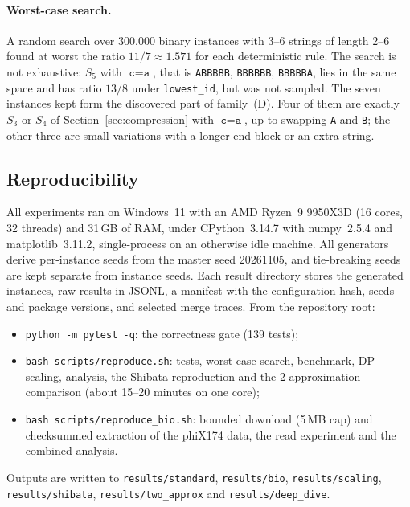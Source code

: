 \documentclass[11pt,a4paper]{article}   %
\theoremstyle{compact}
\theoremstyle{compactdef}
\newcommand{\str}[1]{\texttt{#1}}           %
\begin{document}
\paragraph{Worst-case search.} A random search over 300{,}000 binary
instances with 3--6 strings of length 2--6 found at worst the ratio
$11/7\approx1.571$ for each deterministic rule. The search is not
exhaustive: $S_5$ with $\str{c}=\str{a}$, that is \str{ABBBBB},
\str{BBBBBB}, \str{BBBBBA}, lies in the same space and has ratio $13/8$
under \texttt{lowest\_id}, but was not sampled. The seven instances kept
form the discovered part of family~(D). Four of them are exactly $S_3$ or
$S_4$ of Section~\ref{sec:compression} with $\str{c}=\str{a}$, up to
swapping \str{A} and \str{B}; the other three are small variations with a
longer end block or an extra string.

\subsection{Reproducibility}\label{app:repro}
All experiments ran on Windows~11 with an AMD Ryzen~9 9950X3D (16 cores,
32 threads) and 31\,GB of RAM, under CPython~3.14.7 with numpy~2.5.4 and
matplotlib~3.11.2, single-process on an otherwise idle machine. All
generators derive per-instance seeds from the master seed 20261105, and
tie-breaking seeds are kept separate from instance seeds. Each result
directory stores the generated instances, raw results in JSONL, a manifest
with the configuration hash, seeds and package versions, and selected merge
traces. From the repository root:
\begin{itemize}
\item \texttt{python -m pytest -q}: the correctness gate (139 tests);
\item \texttt{bash scripts/reproduce.sh}: tests, worst-case search,
  benchmark, DP scaling, analysis, the Shibata reproduction and the
  2-approximation comparison (about 15--20 minutes on one core);
\item \texttt{bash scripts/reproduce\_bio.sh}: bounded download (5\,MB cap)
  and checksummed extraction of the phiX174 data, the read experiment and
  the combined analysis.
\end{itemize}
Outputs are written to \texttt{results/standard}, \texttt{results/bio},
\texttt{results/scaling}, \texttt{results/shibata},
\texttt{results/two\_approx} and \texttt{results/deep\_dive}.
\end{document}
